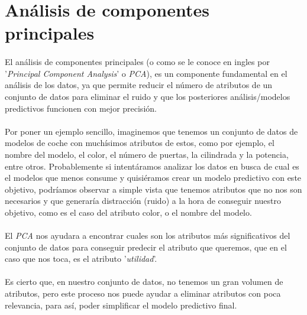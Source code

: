 \section{Análisis de componentes principales}
\label{section:pca}

\paragraph{}
El análisis de componentes principales (o como se le conoce en ingles por '\textit{Principal Component Analysis}' o \textit{PCA}), es un componente fundamental en el análisis de los datos, ya que permite reducir el número de atributos de un conjunto de datos para eliminar el ruido\cite{ref:noisy_data} y que los posteriores análisis/modelos predictivos funcionen con mejor precisión\cite{ref:pca_def}.

\paragraph{}
Por poner un ejemplo sencillo, imaginemos que tenemos un conjunto de datos de modelos de coche con muchísimos atributos de estos, como por ejemplo, el nombre del modelo, el color, el número de puertas, la cilindrada y la potencia, entre otros. Probablemente si intentáramos analizar los datos en busca de cual es el modelos que menos consume y quisiéramos crear un modelo predictivo con este objetivo, podríamos observar a simple vista que tenemos atributos que no nos son necesarios y que generaría distracción (ruido\cite{ref:noisy_data}) a la hora de conseguir nuestro objetivo, como es el caso del atributo color, o el nombre del modelo.

\paragraph{}
El \textit{PCA} nos ayudara a encontrar cuales son los atributos más significativos del conjunto de datos para conseguir predecir el atributo que queremos\cite{ref:pca_def}, que en el caso que nos toca, es el atributo '\textit{utilidad}'.

\paragraph{}
Es cierto que, en nuestro conjunto de datos, no tenemos un gran volumen de atributos, pero este proceso nos puede ayudar a eliminar atributos con poca relevancia, para así, poder simplificar el modelo predictivo final.


